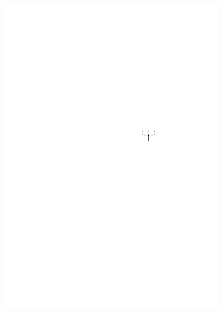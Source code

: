 \documentclass[a4paper]{scrreprt}
\theoremstyle{definition}
\begin{document}
\begin{figure}[h]
        \quad
            {\includegraphics[scale=.8]{oc3_embed/incoming/indeg1}}
        \quad

\end{figure}
\end{document}
